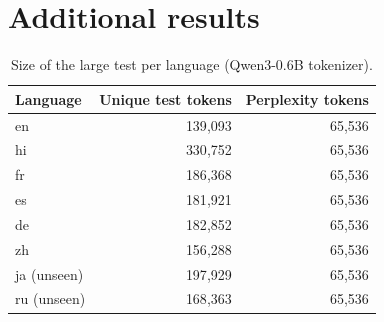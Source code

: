 \documentclass[11pt]{article}
\begin{document}
\section{Additional results}

\begin{table}[h]
\centering\small
{}
\caption{Accuracy (\%) per benchmark, Qwen3-0.6B, 4 layers removed, mean of the six languages.}
\label{tab:bench}
\end{table}

\begin{table}[h]
\centering\small
{}
\caption{Original models on this test vs the Qwen3 report \citep{qwen3}, Table 8. Differences come from the
languages (6 here), question subsets, prompts and MGSM shots (4 vs 8).}
\label{tab:official}
\end{table}

\begin{table}[h]
\centering\small
\begin{tabular}{lrr}
\toprule
Language & Unique test tokens & Perplexity tokens \\
\midrule
en & 139{,}093 & 65{,}536 \\
hi & 330{,}752 & 65{,}536 \\
fr & 186{,}368 & 65{,}536 \\
es & 181{,}921 & 65{,}536 \\
de & 182{,}852 & 65{,}536 \\
zh & 156{,}288 & 65{,}536 \\
ja (unseen) & 197{,}929 & 65{,}536 \\
ru (unseen) & 168{,}363 & 65{,}536 \\
\bottomrule
\end{tabular}
\caption{Size of the large test per language (Qwen3-0.6B tokenizer).}
\label{tab:tokens}
\end{table}
\end{document}
